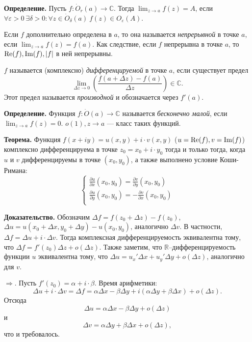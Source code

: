 \textbf{Определение.} Пусть $f: \dot O_r(a) \to \mathbb C$.
Тогда $\lim_{z \to a} f(z) = A$, если $\forall \varepsilon > 0~\exists \delta  > 0: \forall z \in \dot O_\delta(a)~f(z) \in O_\varepsilon(A)$.

Если $f$ дополнительно определена в $a$, то она называется \textit{непрерывной} в точке $a$, если $\lim_{z \to a} f(z) = f(a)$.
Как следствие, если $f$ непрерывна в точке $a$, то $\operatorname{Re}(f), \operatorname{Im}(f), |f|$ в ней непрерывны.

$f$ называется (комплексно) \textit{дифференцируемой} в точке $a$, если существует предел
\[
    \lim_{\Delta z \to 0} \left( \frac{f(a + \Delta z) - f(a)}{\Delta z} \right) \in \mathbb C.
\]
Этот предел называется \textit{производной} и обозначается через $f'(a)$.

\textbf{Определение.} Функция $f: \dot O(a) \to \mathbb C$ называется \textit{бесконечно малой}, если $\lim_{z \to a} f(z) = 0$.
$o(1), z \to a$ --- класс таких функций.

\textbf{Теорема.} Функция $f(x + iy) = u(x, y) + i \cdot v(x, y)$ ($u = \operatorname{Re}(f), v = \operatorname{Im}(f)$) комплексно дифференцируема в точке $z_0 = x_0 + i \cdot y_0$ тогда и только тогда, когда $u$ и $v$ дифференцируемы в точке $(x_0, y_0)$, а также выполнено условие Коши-Римана:
\[
    \begin{cases}
        \frac{\partial u}{\partial x}(x_0, y_0) = \frac{\partial v}{\partial y}(x_0, y_0) \\
        \frac{\partial u}{\partial y}(x_0, y_0) = - \frac{\partial v}{\partial x}(x_0, y_0) \\
    \end{cases}
\]

\textbf{Доказательство.} Обозначим $\Delta f = f(z_0 + \Delta z) - f(z_0)$, $\Delta u = u(x_0 + \Delta x, y_0 + \Delta y) - u(x_0, y_0)$, аналогично $\Delta v$.
В частности, $\Delta f = \Delta u + i \cdot \Delta v$.
Тогда комплексная дифференцируемость эквивалентна тому, что $\Delta f = f'(z_0) \Delta z + o(\Delta z)$.
Также заметим, что $\mathbb R$--дифференцируемость функции $u$ эквивалентна тому, что $\Delta u = u_x' \Delta x + u_y' \Delta y + o(\Delta z)$, аналогично для $v$.

$\Rightarrow$. Пусть $f'(z_0) = \alpha + i \cdot \beta$.
Время арифметики:
\[
    \Delta u + i \cdot \Delta v = \Delta f = \alpha \Delta x - \beta \Delta y + i(\alpha \Delta y + \beta \Delta x) + o(\Delta z).
\]
Отсюда
\[
    \Delta u = \alpha \Delta x - \beta \Delta y + o(\Delta z)
\]
и
\[
    \Delta v = \alpha \Delta y + \beta \Delta x + o(\Delta z),
\]
что и требовалось.

